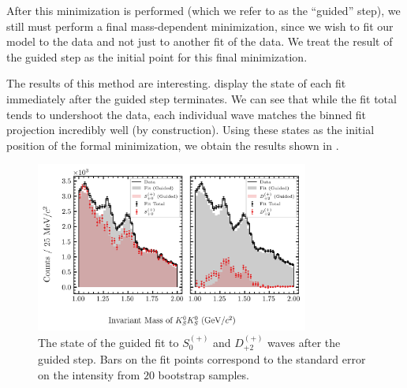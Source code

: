 After this minimization is performed (which we refer to as the ``guided'' step), we still must perform a final mass-dependent minimization, since we wish to fit our model to the data and not just to another fit of the data. We treat the result of the guided step as the initial point for this final minimization.

The results of this method are interesting.  display the state of each fit immediately after the guided step terminates. We can see that while the fit total tends to undershoot the data, each individual wave matches the binned fit projection incredibly well (by construction). Using these states as the initial position of the formal minimization, we obtain the results shown in .

\begin{figure}
  \begin{center}
    \includegraphics[width=0.8\textwidth]{figures/guided_fit_chisqdof_3.4_splot_D_1s_2b_phase_factor_waves491_uncertainty_bootstrap-SE.png}
  \end{center}
  \caption{The state of the guided fit to $S_{0}^{(+)}$ and $D_{+2}^{(+)}$ waves after the guided step. Bars on the fit points correspond to the standard error on the intensity from $20$ bootstrap samples.}\label{fig:guided-fit-chisqdof-3.4-Sp-D2p}
\end{figure}


